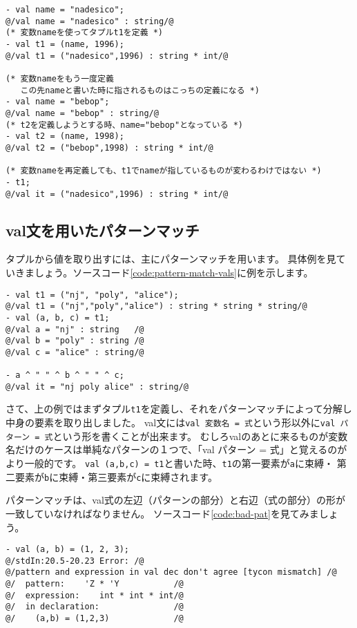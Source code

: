 \documentclass[11pt,a4paper]{article}
\begin{document}
\begin{lstlisting}[caption=valのスコープ,label=code:vals]
- val name = "nadesico";
@/val name = "nadesico" : string/@
(* 変数nameを使ってタプルt1を定義 *)
- val t1 = (name, 1996);
@/val t1 = ("nadesico",1996) : string * int/@

(* 変数nameをもう一度定義
   この先nameと書いた時に指されるものはこっちの定義になる *)
- val name = "bebop";
@/val name = "bebop" : string/@
(* t2を定義しようとする時、name="bebop"となっている *)
- val t2 = (name, 1998);
@/val t2 = ("bebop",1998) : string * int/@

(* 変数nameを再定義しても、t1でnameが指しているものが変わるわけではない *)
- t1;
@/val it = ("nadesico",1996) : string * int/@
\end{lstlisting}



\subsection{val文を用いたパターンマッチ}

タプルから値を取り出すには、主にパターンマッチを用います。
具体例を見ていきましょう。ソースコード\ref{code:pattern-match-vals}に例を示します。

\begin{lstlisting}[caption=val文でパターンマッチ,label=code:pattern-match-vals]
- val t1 = ("nj", "poly", "alice");
@/val t1 = ("nj","poly","alice") : string * string * string/@
- val (a, b, c) = t1;
@/val a = "nj" : string   /@
@/val b = "poly" : string /@
@/val c = "alice" : string/@

- a ^ " " ^ b ^ " " ^ c;
@/val it = "nj poly alice" : string/@
\end{lstlisting}

さて、上の例ではまずタプル\lstinline{t1}を定義し、それをパターンマッチによって分解し中身の要素を取り出しました。
val文には\lstinline{val 変数名 = 式}という形以外に\lstinline{val パターン = 式}という形を書くことが出来ます。
むしろvalのあとに来るものが変数名だけのケースは単純なパターンの１つで、「val パターン = 式」と覚えるのがより一般的です。
\lstinline{val (a,b,c) = t1}と書いた時、\lstinline{t1}の第一要素が\lstinline{a}に束縛・
第二要素が\lstinline{b}に束縛・第三要素が\lstinline{c}に束縛されます。

パターンマッチは、val式の左辺（パターンの部分）と右辺（式の部分）の形が一致していなければなりません。
ソースコード\ref{code:bad-pat}を見てみましょう。
\begin{lstlisting}[caption=型が合わないパターンマッチ,label=code:bad-pat]
- val (a, b) = (1, 2, 3);
@/stdIn:20.5-20.23 Error: /@
@/pattern and expression in val dec don't agree [tycon mismatch] /@
@/  pattern:    'Z * 'Y           /@
@/  expression:    int * int * int/@
@/  in declaration:               /@
@/    (a,b) = (1,2,3)             /@
\end{lstlisting}
\end{document}

